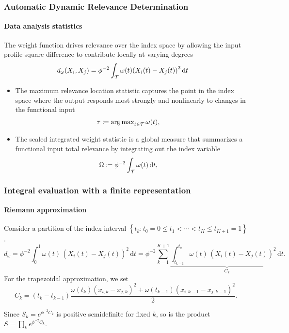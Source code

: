 \documentclass{snedecorbeamer}
\newcommand{\dt}{\, \mathrm{d}t}
\newcommand{\w}{\omega}
\begin{document}
\begin{frame}%
  \label{frm:statistics}
  \frametitle{Automatic Dynamic Relevance Determination}
  \framesubtitle{Data analysis statistics}

  The weight function drives relevance over the index space by allowing the
  input profile square difference to contribute locally at varying degrees
  \begin{align}
    d_\omega(X_i, X_j)
    &= \phi^{-2}\int_{\mathcal{T}}
      \omega(t)
      {\left(X_i(t) - X_j(t) \right)}^2\,\mathrm{d}t
  \end{align}

  \begin{itemize}
  \item The maximum relevance location statistic
    captures the point in the index space where the output responds most
    strongly and nonlinearly to changes in the functional input
    \begin{align}
      \label{eq:01-adrd-maximum-relevance-location}
      \tau&\coloneqq\argmax_{t\in\mathcal{T}}\omega(t),%
    \end{align}
  \item The scaled integrated weight statistic is a global measure that
    summarizes a functional input total relevance by integrating out the index
    variable
  \begin{align}
    \label{eq:01-adrd-scaled-integrated-weight}
    \Omega&\coloneqq\phi^{-2}\int_\mathcal{T}\omega(t)\dx{t},%
  \end{align}
  \end{itemize}
\end{frame}

\begin{frame}%
  \label{frm:integral-riemann}
  \frametitle{Integral evaluation with a finite representation}
  \framesubtitle{Riemann approximation}

  Consider a partition of the index interval $\left\{ t_k: t_0 = 0 \le t_1 <
    \cdots < t_K \le t_{K+1} = 1 \right\}$.
  \begin{equation}
    \label{eq:01-adrd-integrand}
    d_{\omega}
    =\phi^{-2}\int_0^1 \w(t) \, {(X_i(t) - X_j(t))}^2 \dt
    =\phi^{-2}\sum_{k = 1}^{K + 1}
    \underbrace{
      \int_{t_{k-1}}^{t_k} \w(t) \, {(X_i(t) - X_j(t))}^2
      \dt}_{C_k}.
  \end{equation}
  For the trapezoidal approximation, we set
  \begin{equation}
    C_k
    =\left(t_{k} - t_{k - 1}\right) \frac{
      \omega(t_{k}) {\left(x_{i, k} - x_{j, k}\right)}^2 +
      \omega(t_{k-1}) {\left(x_{i, {k-1}} - x_{j, {k-1}}\right)}^2
    }{2}.
  \end{equation}

  Since
  $S_k = e^{\phi^{-2} C_k}$ is positive semidefinite for fixed $k$, so
  is the product $S = \prod_{k} e^{\phi^{-2} C_k}$.
\end{frame}
\end{document}
